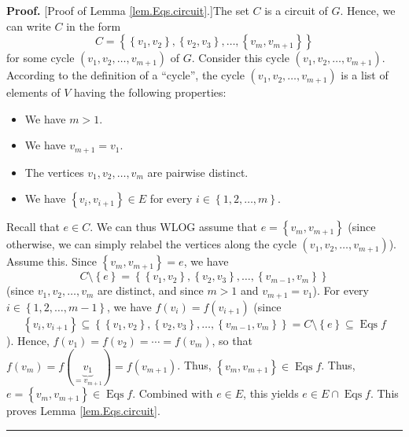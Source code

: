 \documentclass[numbers=enddot,12pt,final,onecolumn,notitlepage]{scrartcl}%
\theoremstyle{definition}
\newenvironment{proof}[1][Proof]{\noindent\textbf{#1.} }{\ \rule{0.5em}{0.5em}}
\newenvironment{vershort}{}{}
\begin{document}
\begin{vershort}
\begin{proof}
[Proof of Lemma \ref{lem.Eqs.circuit}.]The set $C$ is a circuit of $G$. Hence,
we can write $C$ in the form%
\[
C=\left\{  \left\{  v_{1},v_{2}\right\}  ,\left\{  v_{2},v_{3}\right\}
,\ldots,\left\{  v_{m},v_{m+1}\right\}  \right\}
\]
for some cycle $\left(  v_{1},v_{2},\ldots,v_{m+1}\right)  $ of $G$. Consider
this cycle $\left(  v_{1},v_{2},\ldots,v_{m+1}\right)  $. According to the
definition of a \textquotedblleft cycle\textquotedblright, the cycle $\left(
v_{1},v_{2},\ldots,v_{m+1}\right)  $ is a list of elements of $V$ having the
following properties:

\begin{itemize}
\item We have $m>1$.

\item We have $v_{m+1}=v_{1}$.

\item The vertices $v_{1},v_{2},\ldots,v_{m}$ are pairwise distinct.

\item We have $\left\{  v_{i},v_{i+1}\right\}  \in E$ for every $i\in\left\{
1,2,\ldots,m\right\}  $.
\end{itemize}

Recall that $e\in C$. We can thus WLOG assume that $e=\left\{  v_{m}%
,v_{m+1}\right\}  $ (since otherwise, we can simply relabel the vertices along
the cycle $\left(  v_{1},v_{2},\ldots,v_{m+1}\right)  $). Assume this. Since
$\left\{  v_{m},v_{m+1}\right\}  =e$, we have%
\[
C\setminus\left\{  e\right\}  =\left\{  \left\{  v_{1},v_{2}\right\}
,\left\{  v_{2},v_{3}\right\}  ,\ldots,\left\{  v_{m-1},v_{m}\right\}
\right\}
\]
(since $v_{1},v_{2},\ldots,v_{m}$ are distinct, and since $m>1$ and
$v_{m+1}=v_{1}$). For every $i\in\left\{  1,2,\ldots,m-1\right\}  $, we have
$f\left(  v_{i}\right)  =f\left(  v_{i+1}\right)  $ (since
\[
\left\{  v_{i},v_{i+1}\right\}  \subseteq\left\{  \left\{  v_{1}%
,v_{2}\right\}  ,\left\{  v_{2},v_{3}\right\}  ,\ldots,\left\{  v_{m-1}%
,v_{m}\right\}  \right\}  =C\setminus\left\{  e\right\}  \subseteq
\operatorname*{Eqs}f
\]
). Hence, $f\left(  v_{1}\right)  =f\left(  v_{2}\right)  =\cdots=f\left(
v_{m}\right)  $, so that $f\left(  v_{m}\right)  =f\left(  \underbrace{v_{1}%
}_{=v_{m+1}}\right)  =f\left(  v_{m+1}\right)  $. Thus, $\left\{
v_{m},v_{m+1}\right\}  \in\operatorname*{Eqs}f$. Thus, $e=\left\{
v_{m},v_{m+1}\right\}  \in\operatorname*{Eqs}f$. Combined with $e\in E$, this
yields $e\in E\cap\operatorname*{Eqs}f$. This proves Lemma
\ref{lem.Eqs.circuit}.
\end{proof}
\end{vershort}
\end{document}
